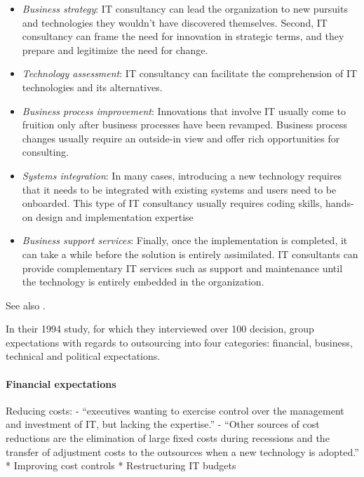 \documentclass[12pt]{article}
\providecommand{\tightlist}{%
  \setlength{\itemsep}{0pt}\setlength{\parskip}{0pt}}
\begin{document}
\begin{itemize}
\tightlist
\item
  \emph{Business strategy}: IT consultancy can lead the organization to
  new pursuits and technologies they wouldn't have discovered
  themselves. Second, IT consultancy can frame the need for innovation
  in strategic terms, and they prepare and legitimize the need for
  change.
\item
  \emph{Technology assessment}: IT consultancy can facilitate the
  comprehension of IT technologies and its alternatives.
\item
  \emph{Business process improvement}: Innovations that involve IT
  usually come to fruition only after business processes have been
  revamped. Business process changes usually require an outside-in view
  and offer rich opportunities for consulting.
\item
  \emph{Systems integration}: In many cases, introducing a new
  technology requires that it needs to be integrated with existing
  systems and users need to be onboarded. This type of IT consultancy
  usually requires coding skills, hands-on design and implementation
  expertise
\item
  \emph{Business support services}: Finally, once the implementation is
  completed, it can take a while before the solution is entirely
  assimilated. IT consultants can provide complementary IT services such
  as support and maintenance until the technology is entirely embedded
  in the organization.
\end{itemize}

See also \citep{bessant1995}.

In their 1994 study, for which they interviewed over 100 decision,
\citet[10-17]{lacity1994} group expectations with regards to outsourcing
into four categories: financial, business, technical and political
expectations.

\hypertarget{financial-expectations}{%
\paragraph{Financial expectations}\label{financial-expectations}}

Reducing costs: - ``executives wanting to exercise control over the
management and investment of IT, but lacking the expertise.'' \citep[
233]{sturdy1998} - ``Other sources of cost reductions are the
elimination of large fixed costs during recessions and the transfer of
adjustment costs to the outsources when a new technology is adopted.''
\citep{aubert1996} * Improving cost controls * Restructuring IT budgets
\end{document}
